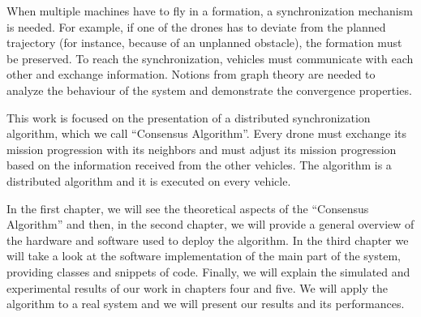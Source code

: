 When multiple machines have to fly in a formation, a synchronization mechanism is
needed. For example, if one of the drones has to deviate from the planned trajectory
(for instance, because of an unplanned obstacle), the formation must be preserved.
To reach the synchronization, vehicles must communicate with each other and
exchange information.
Notions from graph theory are needed to analyze the behaviour of the system
and demonstrate the convergence properties.

This work is focused on the presentation of a distributed synchronization algorithm,
which we call “Consensus Algorithm”. Every drone must exchange its mission progression
with its neighbors and must adjust its mission progression based on the information
received from the other vehicles.
The algorithm is a distributed algorithm and it is executed on every vehicle.


In the first chapter, we will see the theoretical aspects of the “Consensus Algorithm” and then,
in the second chapter, we will provide a general overview of the hardware and software used to deploy the algorithm.
In the third chapter we will take a look at the software implementation of the main part of the
system, providing classes and snippets of code.
Finally, we will explain the simulated and experimental results of our work
in chapters four and five.
We will apply the algorithm to a real system and we will present our results and its
performances.
